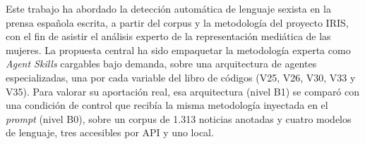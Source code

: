 
Este trabajo ha abordado la detección automática de lenguaje sexista en la prensa
española escrita, a partir del corpus y la metodología del proyecto IRIS, con el fin de asistir el análisis
experto de la representación mediática de las mujeres. La propuesta central ha sido
empaquetar la metodología experta como \textit{Agent Skills} cargables bajo demanda,
sobre una arquitectura de agentes especializadas, una por cada variable del libro de
códigos (V25, V26, V30, V33 y V35). Para valorar su aportación real, esa arquitectura
(nivel B1) se comparó con una condición de control que recibía la misma metodología
inyectada en el \textit{prompt} (nivel B0), sobre un corpus de 1.313 noticias anotadas
y cuatro modelos de lenguaje, tres accesibles por API y uno local.

